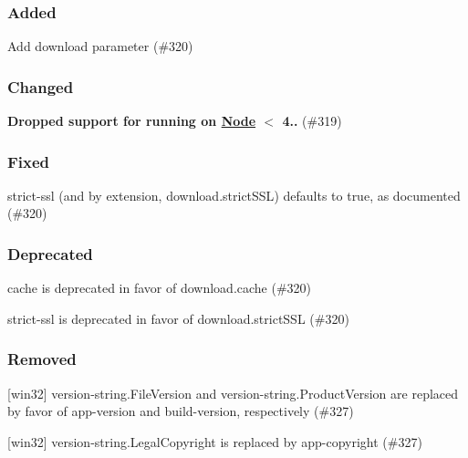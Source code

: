 \subsubsection*{Added}


\begin{DoxyItemize}
\item Add {\ttfamily download} parameter (\#320)
\end{DoxyItemize}

\subsubsection*{Changed}


\begin{DoxyItemize}
\item {\bfseries Dropped support for running on \mbox{\hyperlink{classNode}{Node}} $<$ 4..} (\#319)
\end{DoxyItemize}

\subsubsection*{Fixed}


\begin{DoxyItemize}
\item {\ttfamily strict-\/ssl} (and by extension, {\ttfamily download.\+strict\+S\+SL}) defaults to {\ttfamily true}, as documented (\#320)
\end{DoxyItemize}

\subsubsection*{Deprecated}


\begin{DoxyItemize}
\item {\ttfamily cache} is deprecated in favor of {\ttfamily download.\+cache} (\#320)
\item {\ttfamily strict-\/ssl} is deprecated in favor of {\ttfamily download.\+strict\+S\+SL} (\#320)
\end{DoxyItemize}

\subsubsection*{Removed}


\begin{DoxyItemize}
\item \mbox{[}win32\mbox{]} {\ttfamily version-\/string.\+File\+Version} and {\ttfamily version-\/string.\+Product\+Version} are replaced by favor of {\ttfamily app-\/version} and {\ttfamily build-\/version}, respectively (\#327)
\item \mbox{[}win32\mbox{]} {\ttfamily version-\/string.\+Legal\+Copyright} is replaced by {\ttfamily app-\/copyright} (\#327)
\end{DoxyItemize}

